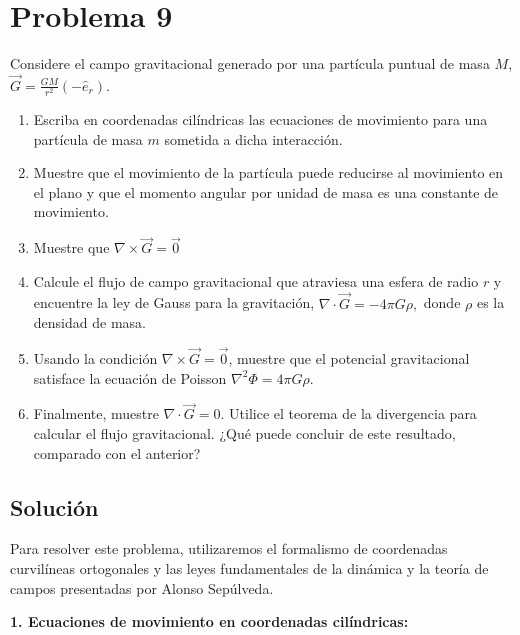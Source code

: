 \documentclass[a4paper]{article}
\begin{document}
\section{Problema 9}
Considere el campo gravitacional generado por una partícula puntual de masa $M$, $\vec{G} = \frac{GM}{r^2}(-\hat{e}_r).$
\begin{enumerate}
    \item Escriba en coordenadas cilíndricas las ecuaciones de movimiento para una partícula de masa $m$ sometida a dicha interacción.
    \item Muestre que el movimiento de la partícula puede reducirse al movimiento en el plano y que el momento angular por unidad de masa es una constante de movimiento.
    \item Muestre que $\nabla \times \vec{G} = \vec{0}$
    \item Calcule el flujo de campo gravitacional que atraviesa una esfera de radio $r$ y encuentre la ley de Gauss para la gravitación, $\nabla \cdot \vec{G} = -4\pi G\rho,$ donde $\rho$ es la densidad de masa.
    \item Usando la condición $\nabla \times \vec{G} = \vec{0}$, muestre que el potencial gravitacional satisface la ecuación de Poisson $\nabla^2 \Phi = 4\pi G\rho$.
    \item Finalmente, muestre $\nabla \cdot \vec{G} = 0$. Utilice el teorema de la divergencia para calcular el flujo gravitacional. ¿Qué puede concluir de este resultado, comparado con el anterior?
\end{enumerate}

\subsection{Solución}

Para resolver este problema, utilizaremos el formalismo de coordenadas curvilíneas ortogonales y las leyes fundamentales de la dinámica y la teoría de campos presentadas por Alonso Sepúlveda.

\textbf{1. Ecuaciones de movimiento en coordenadas cilíndricas:}
\end{document}
